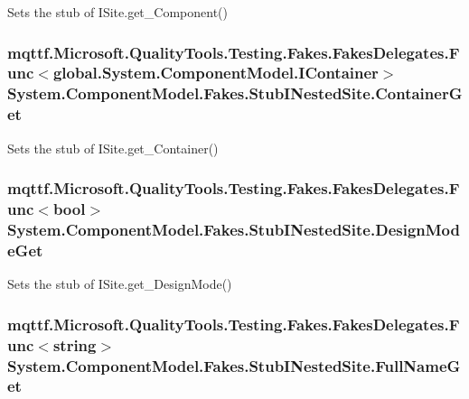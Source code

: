 Sets the stub of I\-Site.\-get\-\_\-\-Component()

\hypertarget{class_system_1_1_component_model_1_1_fakes_1_1_stub_i_nested_site_ad4c329d0a7779a26a210d4db7e3a222f}{
\subsubsection[{Container\-Get}]{\setlength{\rightskip}{0pt plus 5cm}mqttf.\-Microsoft.\-Quality\-Tools.\-Testing.\-Fakes.\-Fakes\-Delegates.\-Func$<$global.\-System.\-Component\-Model.\-I\-Container$>$ System.\-Component\-Model.\-Fakes.\-Stub\-I\-Nested\-Site.\-Container\-Get}}\label{class_system_1_1_component_model_1_1_fakes_1_1_stub_i_nested_site_ad4c329d0a7779a26a210d4db7e3a222f}


Sets the stub of I\-Site.\-get\-\_\-\-Container()

\hypertarget{class_system_1_1_component_model_1_1_fakes_1_1_stub_i_nested_site_ada6b323e64c354e1a040cdb71ae69a24}{
\subsubsection[{Design\-Mode\-Get}]{\setlength{\rightskip}{0pt plus 5cm}mqttf.\-Microsoft.\-Quality\-Tools.\-Testing.\-Fakes.\-Fakes\-Delegates.\-Func$<$bool$>$ System.\-Component\-Model.\-Fakes.\-Stub\-I\-Nested\-Site.\-Design\-Mode\-Get}}\label{class_system_1_1_component_model_1_1_fakes_1_1_stub_i_nested_site_ada6b323e64c354e1a040cdb71ae69a24}


Sets the stub of I\-Site.\-get\-\_\-\-Design\-Mode()

\hypertarget{class_system_1_1_component_model_1_1_fakes_1_1_stub_i_nested_site_a30a51d02a91f9207d87b2c3b76bbbc2d}{
\subsubsection[{Full\-Name\-Get}]{\setlength{\rightskip}{0pt plus 5cm}mqttf.\-Microsoft.\-Quality\-Tools.\-Testing.\-Fakes.\-Fakes\-Delegates.\-Func$<$string$>$ System.\-Component\-Model.\-Fakes.\-Stub\-I\-Nested\-Site.\-Full\-Name\-Get}}\label{class_system_1_1_component_model_1_1_fakes_1_1_stub_i_nested_site_a30a51d02a91f9207d87b2c3b76bbbc2d}


